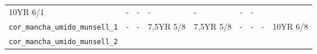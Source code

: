 \documentclass[
  a4paper,
  dvipsnames]{tufte-book}
\begin{document}
\begin{longtable}[]{@{}lllllllll@{}}
\begin{minipage}[t]{0.06\columnwidth}
10YR 6/1\strut
\end{minipage} & \begin{minipage}[t]{0.07\columnwidth}\raggedright
-\strut
\end{minipage} & \begin{minipage}[t]{0.07\columnwidth}\raggedright
-\strut
\end{minipage} & \begin{minipage}[t]{0.07\columnwidth}\raggedright
-\strut
\end{minipage} & \begin{minipage}[t]{0.07\columnwidth}\raggedright
-\strut
\end{minipage} & \begin{minipage}[t]{0.07\columnwidth}\raggedright
-\strut
\end{minipage} & \begin{minipage}[t]{0.06\columnwidth}\raggedright
-\strut
\end{minipage}\tabularnewline
\begin{minipage}[t]{0.22\columnwidth}\raggedright
\texttt{cor\_mancha\_umido\_munsell\_1}\strut
\end{minipage} & \begin{minipage}[t]{0.06\columnwidth}\raggedright
-\strut
\end{minipage} & \begin{minipage}[t]{0.06\columnwidth}\raggedright
-\strut
\end{minipage} & \begin{minipage}[t]{0.07\columnwidth}\raggedright
7,5YR 5/8\strut
\end{minipage} & \begin{minipage}[t]{0.07\columnwidth}\raggedright
7,5YR 5/8\strut
\end{minipage} & \begin{minipage}[t]{0.07\columnwidth}\raggedright
-\strut
\end{minipage} & \begin{minipage}[t]{0.07\columnwidth}\raggedright
-\strut
\end{minipage} & \begin{minipage}[t]{0.07\columnwidth}\raggedright
-\strut
\end{minipage} & \begin{minipage}[t]{0.06\columnwidth}\raggedright
10YR 6/8\strut
\end{minipage}\tabularnewline
\begin{minipage}[t]{0.22\columnwidth}\raggedright
\texttt{cor\_mancha\_umido\_munsell\_2}\strut

\end{minipage}
\end{longtable}
\end{document}
